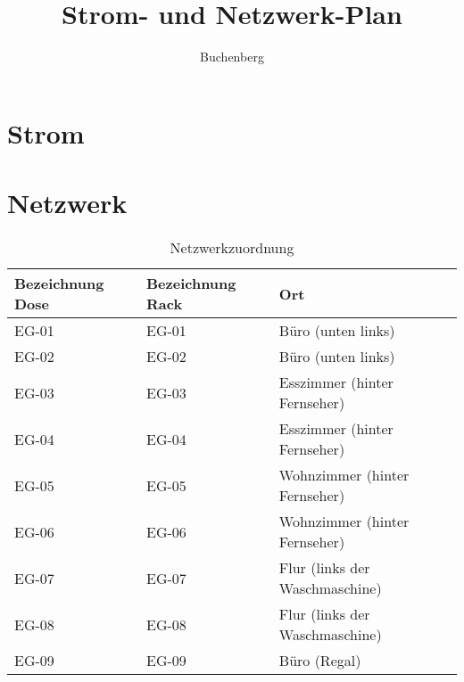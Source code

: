 \documentclass[10pt,a4paper,noendnumber=true]{scrartcl}
\title{Strom- und Netzwerk-Plan}
\subtitle{Buchenberg}
\author{}
\begin{document}
\maketitle

\section{Strom}

\section{Netzwerk}

\begin{table}[H]
	\centering
	\caption{Netzwerkzuordnung}
	\begin{tabular}{lll}
		\toprule
		Bezeichnung Dose & Bezeichnung Rack & Ort \\
		\midrule
		EG-01 & EG-01 & Büro (unten links)\\
		EG-02 & EG-02 & Büro (unten links)\\
		EG-03 & EG-03 & Esszimmer (hinter Fernseher)\\
		EG-04 & EG-04 & Esszimmer (hinter Fernseher)\\
		EG-05 & EG-05 & Wohnzimmer (hinter Fernseher)\\
		EG-06 & EG-06 & Wohnzimmer (hinter Fernseher)\\
		EG-07 & EG-07 & Flur (links der Waschmaschine)\\
		EG-08 & EG-08 & Flur (links der Waschmaschine)\\
		EG-09 & EG-09 & Büro (Regal)\\
		\midrule
		\bottomrule
	\end{tabular}
\end{table}
\end{document}
